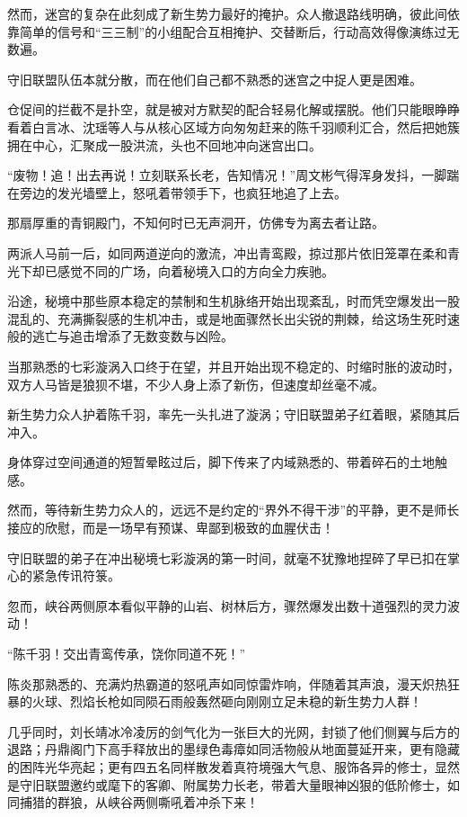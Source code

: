 然而，迷宫的复杂在此刻成了新生势力最好的掩护。众人撤退路线明确，彼此间依靠简单的信号和“三三制”的小组配合互相掩护、交替断后，行动高效得像演练过无数遍。

守旧联盟队伍本就分散，而在他们自己都不熟悉的迷宫之中捉人更是困难。

仓促间的拦截不是扑空，就是被对方默契的配合轻易化解或摆脱。他们只能眼睁睁看着白言冰、沈瑶等人与从核心区域方向匆匆赶来的陈千羽顺利汇合，然后把她簇拥在中心，汇聚成一股洪流，头也不回地冲向迷宫出口。

“废物！追！出去再说！立刻联系长老，告知情况！”周文彬气得浑身发抖，一脚踹在旁边的发光墙壁上，怒吼着带领手下，也疯狂地追了上去。

那扇厚重的青铜殿门，不知何时已无声洞开，仿佛专为离去者让路。

两派人马前一后，如同两道逆向的激流，冲出青鸾殿，掠过那片依旧笼罩在柔和青光下却已感觉不同的广场，向着秘境入口的方向全力疾驰。

沿途，秘境中那些原本稳定的禁制和生机脉络开始出现紊乱，时而凭空爆发出一股混乱的、充满撕裂感的生机冲击，或是地面骤然长出尖锐的荆棘，给这场生死时速般的逃亡与追击增添了无数变数与凶险。

当那熟悉的七彩漩涡入口终于在望，并且开始出现不稳定的、时缩时胀的波动时，双方人马皆是狼狈不堪，不少人身上添了新伤，但速度却丝毫不减。

新生势力众人护着陈千羽，率先一头扎进了漩涡；守旧联盟弟子红着眼，紧随其后冲入。

\vspace{2em}

身体穿过空间通道的短暂晕眩过后，脚下传来了内域熟悉的、带着碎石的土地触感。

然而，等待新生势力众人的，远远不是约定的“界外不得干涉”的平静，更不是师长接应的欣慰，而是一场早有预谋、卑鄙到极致的血腥伏击！

守旧联盟的弟子在冲出秘境七彩漩涡的第一时间，就毫不犹豫地捏碎了早已扣在掌心的紧急传讯符箓。

忽而，峡谷两侧原本看似平静的山岩、树林后方，骤然爆发出数十道强烈的灵力波动！

“陈千羽！交出青鸾传承，饶你同道不死！”

陈炎那熟悉的、充满灼热霸道的怒吼声如同惊雷炸响，伴随着其声浪，漫天炽热狂暴的火球、烈焰长枪如同陨石雨般轰然砸向刚刚立足未稳的新生势力人群！

几乎同时，刘长靖冰冷凌厉的剑气化为一张巨大的光网，封锁了他们侧翼与后方的退路；丹鼎阁门下高手释放出的墨绿色毒瘴如同活物般从地面蔓延开来，更有隐藏的困阵光华亮起；更有四五名同样散发着真符境强大气息、服饰各异的修士，显然是守旧联盟邀约或麾下的客卿、附属势力长老，带着大量眼神凶狠的低阶修士，如同捕猎的群狼，从峡谷两侧嘶吼着冲杀下来！

